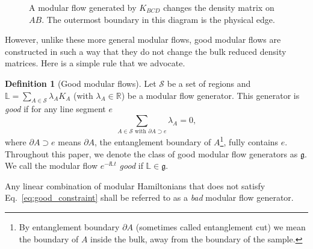 \documentclass[12pt, nofootinbib]{article}
\theoremstyle{plain}
\theoremstyle{assumption}
\theoremstyle{definition}
\newtheorem{definition}[theorem]{Definition} %
\theoremstyle{plain}
\theoremstyle{plain}
\theoremstyle{plain}
\theoremstyle{plain}
\theoremstyle{plain}
\newcommand{\calS}{{\mathcal S}}
\def\Lb{\mathbb{L}}
\begin{document}
\begin{figure}[h]
    \centering
    \caption{A modular flow generated by $K_{BCD}$ changes the density matrix on $AB$. The outermost boundary in this diagram is the physical edge.}
    \label{fig:flow_changing_rdm}
\end{figure}

However, unlike these more general modular flows, good modular flows are constructed in such a way that they do not change the bulk reduced density matrices. Here is a simple rule that we advocate.

\begin{definition}[Good modular flows]
Let $\calS$ be a set of regions and $\mathbb{L} = \sum_{A\in\calS} \lambda_A K_A$ (with $\lambda_A \in \mathbb{R}$) be a modular flow generator. 
This generator is \emph{good} if for any line segment $e$
\begin{equation} 
    \sum_{A\in \calS \text { with } \partial A\supset e } \lambda_A=0, \label{eq:good_constraint}
\end{equation}
where $\partial A\supset e $ means $\partial A$, the entanglement boundary of $A$\footnote{By entanglement boundary $\partial A$ (sometimes called entanglement cut) we mean the boundary of $A$ inside the bulk, away from the boundary of the sample.}, fully contains $e$.
Throughout this paper, we denote the class of good modular flow generators as $\mathfrak{g}$. We call the modular flow $e^{-\ii \Lb t}$ \emph{good} if $\Lb \in\mathfrak{g}$. 
\label{definition:good_modular_flow_succinct}
\end{definition}

Any linear combination of modular Hamiltonians that does not satisfy Eq.~\eqref{eq:good_constraint} shall be referred to as a \emph{bad} modular flow generator. 
\end{document}
